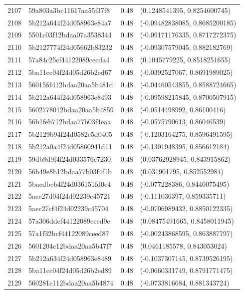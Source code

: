 \begin{table}[ht]
\begin{tabular}{rlrl}
  2107 & 59a803a3bc11617aa55f37f8 & 0.48 & (0.1248541395, 0.8254600745) \\ 
  2108 & 5b212a644f24d058963e84a7 & 0.48 & (-0.09482838085, 0.8685200185) \\ 
  2109 & 5501c03f12bdaa07a3538344 & 0.48 & (-0.09171176335, 0.8717272375) \\ 
  2110 & 5b2127774f24d05662b83232 & 0.48 & (-0.09307579045, 0.882182769) \\ 
  2111 & 57a84c25cf44122089ceeda4 & 0.48 & (0.1045779225, 0.8518251655) \\ 
  2112 & 5ba11cc04f24d05d26b2ed67 & 0.48 & (-0.0392527067, 0.8691989025) \\ 
  2113 & 56015fd412bdaa20aa5b481d & 0.48 & (-0.04460543855, 0.8588724665) \\ 
  2114 & 5b212a644f24d058963e8493 & 0.48 & (-0.09598215845, 0.8700507915) \\ 
  2115 & 5602778012bdaa20aa5b4859 & 0.48 & (-0.0514498992, 0.86100416) \\ 
  2116 & 56b1feb712bdaa77b03f4eaa & 0.48 & (-0.0575790613, 0.86046539) \\ 
  2117 & 5b2129b94f24d0582e5d0405 & 0.48 & (-0.1203164275, 0.8596491595) \\ 
  2118 & 5b212a0a4f24d05860941d11 & 0.48 & (-0.1391948395, 0.856612184) \\ 
  2119 & 59db9d9f4f24d033576c7230 & 0.48 & (0.03762928945, 0.843915862) \\ 
  2120 & 56b49e8b12bdaa77b03f4f1b & 0.48 & (0.031901795, 0.852552984) \\ 
  2121 & 5bacdbcb4f24d036151fd0e4 & 0.48 & (-0.077228386, 0.8446075495) \\ 
  2122 & 5aec27d04f24d02239c45721 & 0.48 & (-0.111036397, 0.859335711) \\ 
  2123 & 5aec27cf4f24d02239c45704 & 0.48 & (-0.0706989432, 0.8850122335) \\ 
  2124 & 57a306ddcf44122089ceed9e & 0.48 & (0.08475491665, 0.8458011945) \\ 
  2125 & 57a1f32bcf44122089ceed87 & 0.48 & (-0.00243868595, 0.863887797) \\ 
  2126 & 5601204c12bdaa20aa5b47f7 & 0.48 & (0.0461185578, 0.843053024) \\ 
  2127 & 5b212a634f24d058963e8489 & 0.48 & (-0.1037307145, 0.8739526195) \\ 
  2128 & 5ba11cc04f24d05d26b2ed89 & 0.48 & (-0.0660331749, 0.8791771475) \\ 
  2129 & 560281c112bdaa20aa5b4874 & 0.48 & (-0.0733816684, 0.881343724) \\ 

\end{tabular}
\end{table}
